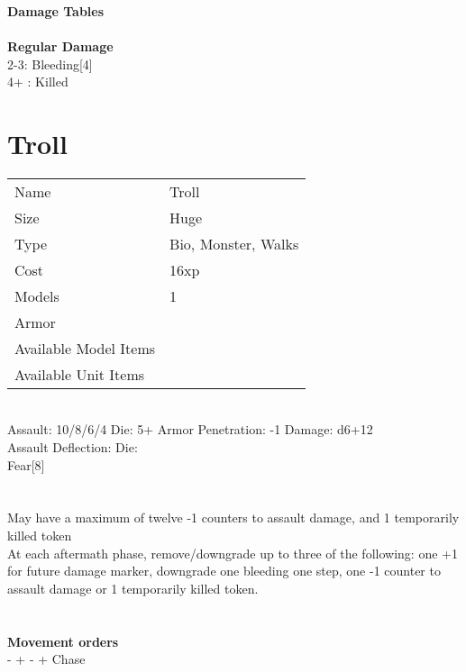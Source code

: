 \ \\ {\bf  } \\
 \\



{\bf Damage Tables} \\
\ \\ {\bf Regular Damage } \\
2-3: Bleeding[4] \\
4+ : Killed \\









\pagebreak

\section{ Troll }

\begin{tabular}{ll}
  Name & Troll \\
  Size & Huge\\
  Type & Bio, Monster, Walks\\
  Cost & 16xp\\
  Models & 1\\
  Armor & \\
  Available Model Items &  \\
  Available Unit Items &  \\
\end{tabular}

\ \\
Assault: 10/8/6/4 Die: 5+ Armor Penetration: -1 Damage: d6+12 \\
Assault Deflection:  Die: \\
\indent Fear[8]\\ \\
\ \\
May have a maximum of twelve -1 counters to assault damage, and 1 temporarily killed token\\ At each aftermath phase, remove/downgrade up to three of the following: one +1 for future damage marker, downgrade one bleeding one step, one -1 counter to assault damage or 1 temporarily killed token.\\
\ \\


\ \\ {\bf Movement orders } \\
- + - + Chase \\



